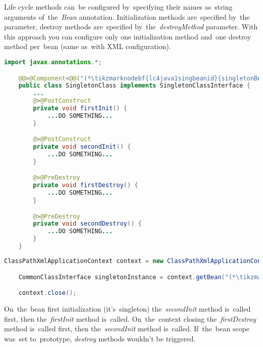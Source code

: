 Life cycle methods can~be configured by~specifying their names as~string arguments of~the~\textit{Bean} annotation. Initialization methods are~specified by~the~ parameter, destroy methods are~specified by~the~\textit{destroyMethod} parameter. With this approach you can configure only one initialization method and~one destroy method per~bean (same as~with XML configuration).
\newpage

\begin{lstlisting}[language=Java, title={Singleton bean class with multiple life cycle methods}]
    import javax.annotations.*;

    @@>@Component<@@("(*\tikzmarknodebf{lc4java1singbeanid}{singletonBeanId}[ForestGreen]*)")
    public class SingletonClass implements SingletonClassInterface {
        ...
        @>@PostConstruct
        private void firstInit() {
            ...DO SOMETHING...
        }

        @>@PostConstruct
        private void secondInit() {
            ...DO SOMETHING...
        }

        @>@PreDestroy
        private void firstDestroy() {
            ...DO SOMETHING...
        }

        @>@PreDestroy
        private void secondDestroy() {
            ...DO SOMETHING...
        }
    }
\end{lstlisting}
\begin{lstlisting}[language=Java, title={Usage}]
    ClassPathXmlApplicationContext context = new ClassPathXmlApplicationContext("configurationFile.xml");

    CommonClassInterface singletonInstance = context.getBean("(*\tikzmarknodebf{lc4java2singbeanid}{singletonBeanId}[ForestGreen]*)", SingletonClassInterface.class);

    context.close();
\end{lstlisting}

\noindent On~the~bean first initialization (it's~singleton) the~\textit{secondInit} method is~called first, then the~\textit{firstInit} method is~called. On~the~context closing the~\textit{firstDestroy} method is~called first, then the~\textit{secondInit} method is~called. If~the~bean scope was~set to~prototype, \textit{destroy} methods wouldn't be triggered.
\newpage

